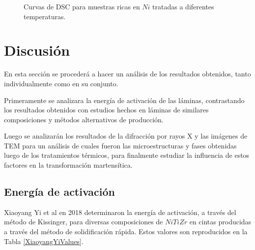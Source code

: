 \documentclass[12pt]{article}
\theoremstyle{definition}
\theoremstyle{remark}
\begin{document}
{\begin{figure}[H]
\noindent{}
	
 \caption{Curvas de DSC para muestras ricas en $Ni$ tratadas a diferentes temperaturas.}
\label{DSCNiRich}

\end{figure}

\newpage

\section{Discusión}
En esta sección se procederá a hacer un análisis de los resultados obtenidos, tanto individualmente como en su conjunto.

Primeramente se analizara la energía de activación de las láminas, contrastando los resultados obtenidos con estudios hechos en láminas de similares composiciones y métodos alternativos de producción.

Luego se analizarán los resultados de la difracción por rayos X y las imágenes de TEM para un análisis de cuales fueron las microestructuras y fases obtenidas luego de los tratamientos térmicos, para finalmente estudiar la influencia de estos factores en la transformación martensítica.

\subsection{Energía de activación}

Xiaoyang Yi et al \citep{XiaoyangYi2018} en 2018 determinaron la energía de activación, a través del método de Kissinger, para diversas composiciones de $NiTiZr$ en cintas producidas a través del método de solidificación rápida. Estos valores son reproducidos en la Tabla \ref{XiaoyangYiValues}.

}
\end{document}
